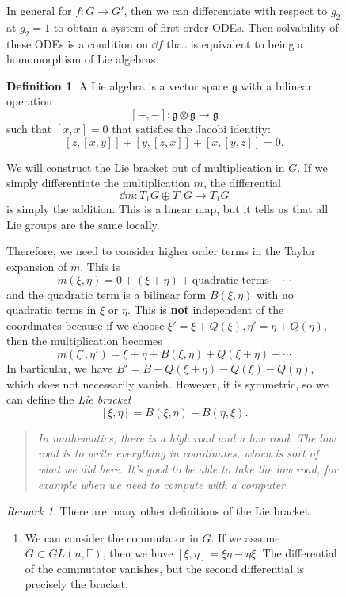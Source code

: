 \documentclass[leqno, openany]{memoir}
\theoremstyle{definition}
\newtheorem{defn}[thm]{Definition}
\theoremstyle{remark}
\newtheorem{rmk}[thm]{Remark}
\theoremstyle{plain}
\theoremstyle{definition}
\theoremstyle{remark}
\newcommand{\F}{\mathbb{F}}
\newcommand{\mf}[1]{\mathfrak{#1}}
\begin{document}
\begin{figure}[H]
In general for $f \colon G \to G'$, then we can differentiate with respect to
$g_2$ at $g_2 = 1$ to obtain a system of first order ODEs. Then solvability of
these ODEs is a condition on $\dd f$ that is equivalent to being a homomorphism
of Lie algebras.

\begin{defn} A Lie algebra is a vector space $\mf{g}$ with a bilinear operation
    \[ [-,-] \colon \mf{g} \otimes \mf{g} \to \mf{g} \] such that $[x,x] = 0$
    that satisfies the Jacobi identity: \[ [z, [x,y]] + [y, [z,x]] + [x, [y,z]]
    = 0. \] \end{defn}

We will construct the Lie bracket out of multiplication in $G$. If we simply
differentiate the multiplication $m$, the differential \[ \dd m \colon T_1 G
\oplus T_1 G \to T_1 G \] is simply the addition. This is a linear map, but it
tells us that all Lie groups are the same locally.

Therefore, we need to consider higher order terms in the Taylor expansion of
$m$. This is \[ m(\xi, \eta) = 0 + (\xi + \eta) + \text{quadratic terms} +
\cdots \] and the quadratic term is a bilinear form $B(\xi, \eta)$ with no
quadratic terms in $\xi$ or $\eta$. This is \textbf{not} independent of the
coordinates because if we choose $\xi' = \xi + Q(\xi), \eta' = \eta + Q(\eta)$,
then the multiplication becomes \[ m(\xi', \eta') = \xi + \eta + B(\xi, \eta) +
Q(\xi + \eta) + \cdots \] In barticular, we have $B' = B + Q(\xi + \eta) -
Q(\xi) - Q(\eta)$, which does not necessarily vanish. However, it is symmetric,
so we can define the \textit{Lie bracket} \[ [\xi, \eta] = B(\xi, \eta) -
B(\eta, \xi). \]

\begin{quotation} \itshape In mathematics, there is a high road and a low road.
    The low road is to write everything in coordinates, which is sort of what
    we did here. It's good to be able to take the low road, for example when we
    need to compute with a computer. 
\end{quotation}

\begin{rmk} There are many other definitions of the Lie bracket.
    \begin{enumerate} \item We can consider the commutator in $G$. If we assume
        $G \subset GL(n, \F)$, then we have $[\xi, \eta] = \xi \eta - \eta
        \xi$. The differential of the commutator vanishes, but the second
        differential is precisely the bracket.  \end{enumerate} \end{rmk}


\end{figure}
\end{document}
